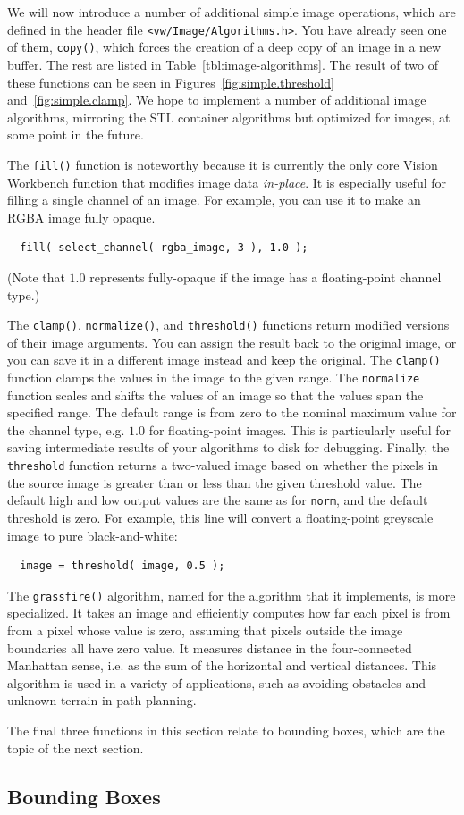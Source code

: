 We will now introduce a number of additional simple image operations,
which are defined in the header file \verb#<vw/Image/Algorithms.h>#.
You have already seen one of them, \verb#copy()#, which forces the 
creation of a deep copy of an image in a new buffer.  The rest are 
listed in Table~\ref{tbl:image-algorithms}.  The result of two of 
these functions can be seen in Figures~\ref{fig:simple.threshold} 
and~\ref{fig:simple.clamp}.  We hope to implement a number of 
additional image algorithms, mirroring the STL container algorithms 
but optimized for images, at some point in the future.

The \verb#fill()# function is noteworthy because it is currently the
only core Vision Workbench function that modifies image data {\it
  in-place}.  It is especially useful for filling a single channel of
an image.  For example, you can use it to make an RGBA image fully
opaque.
\begin{verbatim}
  fill( select_channel( rgba_image, 3 ), 1.0 );
\end{verbatim}
(Note that $1.0$ represents fully-opaque if the image has a 
floating-point channel type.)

The \verb#clamp()#, \verb#normalize()#, and \verb#threshold()#
functions return modified versions of their image arguments.
You can assign the result back to the original image, or you can 
save it in a different image instead and keep the original.  
The \verb#clamp()# function clamps the values in the image to 
the given range.  The \verb#normalize# function scales and 
shifts the values of an image so that the values span the 
specified range.  The default range is from zero to the nominal 
maximum value for the channel type, e.g. $1.0$ for floating-point 
images.  This is particularly useful for saving intermediate 
results of your algorithms to disk for debugging.  Finally, the 
\verb#threshold# function returns a two-valued image based on  
whether the pixels in the source image is greater than or less 
than the given threshold value.  The default high and low output 
values are the same as for \verb#norm#, and the default threshold 
is zero.  For example, this line will convert a floating-point 
greyscale image to pure black-and-white:
\begin{verbatim}
  image = threshold( image, 0.5 );
\end{verbatim}

The \verb#grassfire()# algorithm, named for the algorithm that 
it implements, is more specialized.  It takes an image and 
efficiently computes how far each pixel is from from a pixel 
whose value is zero, assuming that pixels outside the image 
boundaries all have zero value.  It measures distance in the 
four-connected Manhattan sense, i.e. as the sum of the 
horizontal and vertical distances.  This algorithm is used in 
a variety of applications, such as avoiding obstacles and 
unknown terrain in path planning.

The final three functions in this section relate to bounding 
boxes, which are the topic of the next section.

\subsection{Bounding Boxes}

